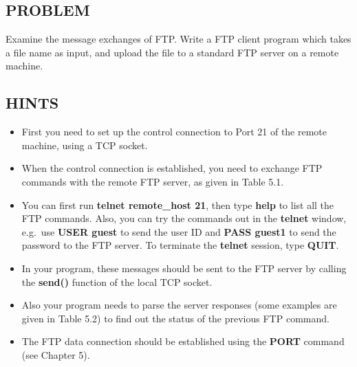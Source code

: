 \documentclass[10pt,a4paper]{article}
\numberwithin{equation}{section}
\numberwithin{figure}{section}
\numberwithin{table}{section}
\begin{document}
    \subsection*{PROBLEM}
    Examine the message exchanges of FTP. Write a FTP client program which takes a file name as input, and upload the file to a standard FTP server on a remote machine.
    \subsection*{HINTS}
    \begin{itemize}
        \item First you need to set up the control connection to Port 21 of the remote machine, using a TCP socket.
        \item When the control connection is established, you need to exchange FTP commands with the remote FTP server, as given in Table 5.1.
        \item You can first run \textbf{telnet remote\_host 21}, then type \textbf{help} to list all the FTP commands.
        Also, you can try the commands out in the \textbf{telnet} window, e.g.\  use \textbf{USER guest} to send the user ID and \textbf{PASS guest1} to send the password to the FTP server.
        To terminate the \textbf{telnet} session, type \textbf{QUIT}.
        \item In your program, these messages should be sent to the FTP server by calling the \textbf{send()} function of the local TCP socket.
        \item Also your program needs to parse the server responses (some examples are given in Table 5.2) to find out the status of the previous FTP command.
        \item The FTP data connection should be established using the \textbf{PORT} command (see Chapter 5).
    \end{itemize}
\fi
\end{document}
